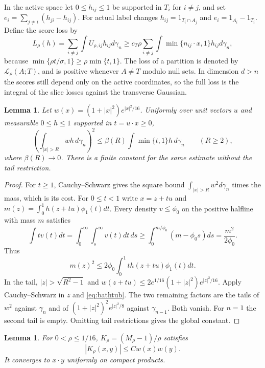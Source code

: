 \documentclass[11pt,reqno]{amsart}
\newtheorem{lemma}[theorem]{Lemma}
\newcommand{\ga}{\gamma}
\newcommand{\LL}{\mathcal L}
\begin{document}
In the active space let $0\le h_{ij}\le1$ be supported in $T_i$
for $i\ne j$, and set $e_i=\sum_{j\ne i}(h_{ji}-h_{ij})$.
For actual label changes $h_{ij}=1_{T_i\cap A_j}$ and
$e_i=1_{A_i}-1_{T_i}$. Define the score loss by
\begin{equation}\label{eq:regret-cost}
 L_\rho(h)=\sum_{i\ne j}\int U_{\rho,ij}h_{ij}d\ga_n
 \ge c_T\rho\sum_{i\ne j}\int\min\{n_{ij}\cdot x,1\}h_{ij}d\ga_n,
\end{equation}
because $\min\{\rho t/\sigma,1\}\ge\rho\min\{t,1\}$.
The loss of a partition is denoted by $\LL_\rho(A;T)$, and is
positive whenever $A\ne T$ modulo null sets. In dimension $d>n$ the
scores still depend only on the active coordinates, so the full loss
is the integral of the slice losses against the transverse Gaussian.

\begin{lemma}\label{lem:weighted}
Let $w(x)=(1+|x|^2)e^{|x|^2/16}$. Uniformly over unit vectors $u$
and measurable $0\le h\le1$ supported in $t=u\cdot x\ge0$,
\begin{equation}\label{eq:weighted-tail}
 \left(\int_{|x|>R}wh\,d\ga_n\right)^2
 \le\beta(R)\int\min\{t,1\}h\,d\ga_n\qquad(R\ge2),
\end{equation}
where $\beta(R)\to0$. There is a finite constant for the same estimate
without the tail restriction.
\end{lemma}

\begin{proof}
For $t\ge1$, Cauchy--Schwarz gives the square bound
$\int_{|x|>R}w^2d\ga_n$ times the mass, which is its cost.
For $0\le t<1$ write $x=z+tu$ and
$m(z)=\int_0^1h(z+tu)\phi_1(t)dt$.
Every density $v\le\phi_0$ on the positive halfline with mass $m$
satisfies
\[
 \int tv(t)dt=\int_0^\infty\int_s^\infty v(t)dt\,ds
 \ge\int_0^{m/\phi_0}(m-\phi_0s)ds=\frac{m^2}{2\phi_0}.
\]
Thus
\begin{equation}\label{eq:bathtub}
 m(z)^2\le2\phi_0\int_0^1t h(z+tu)\phi_1(t)dt.
\end{equation}
In the tail, $|z|>\sqrt{R^2-1}$ and
$w(z+tu)\le2e^{1/16}(1+|z|^2)e^{|z|^2/16}$.
Apply Cauchy--Schwarz in $z$ and \eqref{eq:bathtub}.
The two remaining factors are the tails of $w^2$ against $\ga_n$ and
of $(1+|z|^2)^2e^{|z|^2/8}$ against $\ga_{n-1}$. Both vanish.
For $n=1$ the second tail is empty. Omitting tail restrictions gives
the global constant.
\end{proof}

\begin{lemma}\label{lem:kernel}
For $0<\rho\le1/16$, $K_\rho=(M_\rho-1)/\rho$ satisfies
\begin{equation}\label{eq:kernel-weight}
 |K_\rho(x,y)|\le Cw(x)w(y).
\end{equation}
It converges to $x\cdot y$ uniformly on compact products.
\end{lemma}
\end{document}
